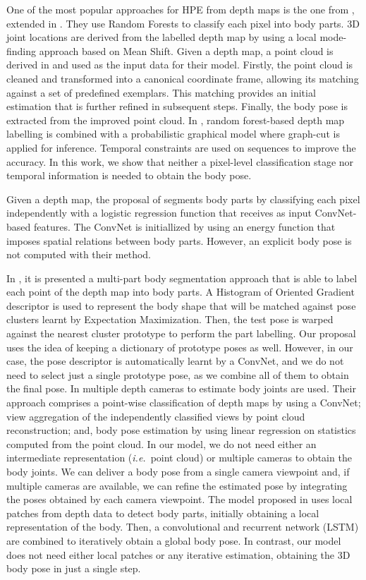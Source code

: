 \documentclass[review,12pt,3p]{elsarticle}
\def \ie{\textit{i.e.}}
\begin{document}
One of the most popular approaches for HPE from depth maps is the one from \citep{Shotton11cvpr}, extended in \citep{Shotton2013pami}. They use Random Forests to classify each pixel into body parts. 3D joint locations are derived from the  labelled depth map by using a local mode-finding approach based on Mean Shift.
%
Given a depth map, a point cloud is derived in \cite{ye2011iccv} and used as the input data for their model. Firstly, the point cloud is cleaned and transformed into a canonical coordinate frame, allowing its matching against a set of predefined exemplars. This matching provides an initial estimation that is further refined in subsequent steps. Finally, the body pose is extracted from the improved point cloud.
%
In \citep{Hernandez2012}, random forest-based depth map labelling is combined with a probabilistic graphical model where graph-cut is applied for inference. Temporal constraints are used on sequences to improve the accuracy. 
%
In this work, we show that neither a pixel-level classification stage nor temporal information is needed to obtain the body pose.

Given a depth map, the proposal of \citep{Jiu2014} segments body parts by classifying each pixel independently  with a logistic regression function that receives as input ConvNet-based features. The ConvNet is initiallized by using an energy function that imposes spatial relations between body parts. However, an explicit body pose is not computed with their method.

In \citep{Madadi2015}, it is presented a multi-part body segmentation approach that is able to label each point of the depth map into body parts. A Histogram of Oriented Gradient descriptor is used to represent the body shape that will be matched against pose clusters learnt by Expectation Maximization. Then, the test pose is warped against the nearest cluster prototype to perform the part labelling.
Our proposal uses the idea of keeping a dictionary of prototype poses as well. However, in our case, the pose descriptor is automatically learnt by a ConvNet, and we do not need to select just a single prototype pose, as we combine all of them to obtain the final pose.
%
% 
In \citep{Shafaei16} multiple depth cameras to estimate body joints are used. Their approach comprises a point-wise classification of depth maps by using a ConvNet; view aggregation of the independently classified views by point cloud reconstruction; and, body pose estimation by using linear regression on statistics computed from the point cloud.
In our model, we do not need either an intermediate representation (\ie~point cloud) or multiple cameras to obtain the body joints. We can deliver a body pose from a single camera viewpoint and, if multiple cameras are available, we can refine the estimated pose by integrating the poses obtained by each camera viewpoint.
%
The model proposed in \cite{haque2016eccv} uses local patches from depth data to detect body parts, initially obtaining a local representation of the body. Then, a convolutional and recurrent network (LSTM) are combined to iteratively obtain a global body pose.
In contrast, our model does not need either local patches or any iterative estimation, obtaining the 3D body pose in just a single step.
\end{document}
